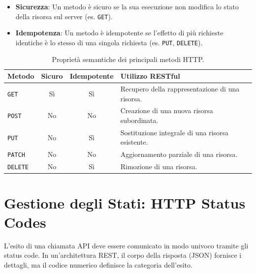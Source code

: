 \documentclass[11pt,a4paper]{report}
\begin{document}
\begin{itemize}[leftmargin=3em]
    \item \textbf{Sicurezza}: Un metodo è sicuro se la sua esecuzione non modifica lo stato della risorsa sul server (es. \texttt{GET}).
    \item \textbf{Idempotenza}: Un metodo è idempotente se l'effetto di più richieste identiche è lo stesso di una singola richiesta (es. \texttt{PUT}, \texttt{DELETE}).
\end{itemize}

\begin{table}[ht]
\centering
\begin{tabular}{lccl}
\toprule
\textbf{Metodo} & \textbf{Sicuro} & \textbf{Idempotente} & \textbf{Utilizzo RESTful} \\
\midrule
\texttt{GET}    & Sì & Sì & Recupero della rappresentazione di una risorsa. \\
\texttt{POST}   & No & No & Creazione di una nuova risorsa subordinata. \\
\texttt{PUT}    & No & Sì & Sostituzione integrale di una risorsa esistente. \\
\texttt{PATCH}  & No & No & Aggiornamento parziale di una risorsa. \\
\texttt{DELETE} & No & Sì & Rimozione di una risorsa. \\
\bottomrule
\end{tabular}
\caption{Proprietà semantiche dei principali metodi HTTP.}
\label{tab:http_methods}
\end{table}

\section{Gestione degli Stati: HTTP Status Codes}
L'esito di una chiamata API deve essere comunicato in modo univoco tramite gli status code. In un'architettura REST, il corpo della risposta (JSON) fornisce i dettagli, ma il codice numerico definisce la categoria dell'esito.
\end{document}

